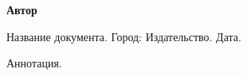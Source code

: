\vspace*{1cm}

\textbf{Автор}

Название документа. Город: Издательство. Дата.
    
\vspace{3cm}
Аннотация.

\newpage